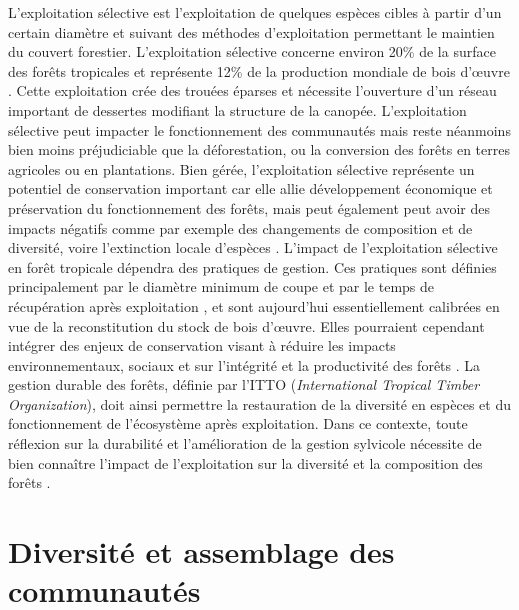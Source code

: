 \documentclass[
  11pt,
  french,
  A4paper,
  extrafontsizes,onecolumn,openright
  ]{memoir}
\begin{document}
L'exploitation sélective est l'exploitation de quelques espèces cibles à
partir d'un certain diamètre et suivant des méthodes d'exploitation
permettant le maintien du couvert forestier. L'exploitation sélective
concerne environ 20\% de la surface des forêts tropicales et représente
12\% de la production mondiale de bois d'œuvre \autocite{Martin2015}.
Cette exploitation crée des trouées éparses et nécessite l'ouverture
d'un réseau important de dessertes modifiant la structure de la canopée.
L'exploitation sélective peut impacter le fonctionnement des communautés
mais reste néanmoins bien moins préjudiciable que la déforestation, ou
la conversion des forêts en terres agricoles ou en plantations. Bien
gérée, l'exploitation sélective représente un potentiel de conservation
important car elle allie développement économique et préservation du
fonctionnement des forêts, mais peut également peut avoir des impacts
négatifs comme par exemple des changements de composition et de
diversité, voire l'extinction locale d'espèces \autocite{Gibson2011}.
L'impact de l'exploitation sélective en forêt tropicale dépendra des
pratiques de gestion. Ces pratiques sont définies principalement par le
diamètre minimum de coupe et par le temps de récupération après
exploitation \autocite{Sist2015}, et sont aujourd'hui essentiellement
calibrées en vue de la reconstitution du stock de bois d'œuvre. Elles
pourraient cependant intégrer des enjeux de conservation visant à
réduire les impacts environnementaux, sociaux et sur l'intégrité et la
productivité des forêts \autocite{ITTO2005}. La gestion durable des
forêts, définie par l'ITTO (\emph{International Tropical Timber
Organization}), doit ainsi permettre la restauration de la diversité en
espèces et du fonctionnement de l'écosystème après exploitation. Dans ce
contexte, toute réflexion sur la durabilité et l'amélioration de la
gestion sylvicole nécessite de bien connaître l'impact de l'exploitation
sur la diversité et la composition des forêts .

\section{Diversité et assemblage des
communautés}\label{diversite-et-assemblage-des-communautes}
\end{document}
